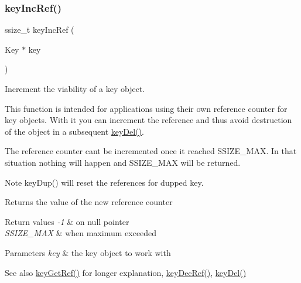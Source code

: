 \subsubsection{\texorpdfstring{key\+Inc\+Ref()}{keyIncRef()}}
{\footnotesize\ttfamily ssize\+\_\+t key\+Inc\+Ref (\begin{DoxyParamCaption}\item[{Key $\ast$}]{key }\end{DoxyParamCaption})}



Increment the viability of a key object. 

This function is intended for applications using their own reference counter for key objects. With it you can increment the reference and thus avoid destruction of the object in a subsequent \hyperlink{group__key_ga3df95bbc2494e3e6703ece5639be5bb1}{key\+Del()}.

The reference counter can\textquotesingle{}t be incremented once it reached S\+S\+I\+Z\+E\+\_\+\+M\+AX. In that situation nothing will happen and S\+S\+I\+Z\+E\+\_\+\+M\+AX will be returned.

\begin{DoxyNote}{Note}
key\+Dup() will reset the references for dupped key.
\end{DoxyNote}
\begin{DoxyReturn}{Returns}
the value of the new reference counter 
\end{DoxyReturn}

\begin{DoxyRetVals}{Return values}
{\em -\/1} & on null pointer \\
\hline
{\em S\+S\+I\+Z\+E\+\_\+\+M\+AX} & when maximum exceeded \\
\hline
\end{DoxyRetVals}

\begin{DoxyParams}{Parameters}
{\em key} & the key object to work with \\
\hline
\end{DoxyParams}
\begin{DoxySeeAlso}{See also}
\hyperlink{group__key_ga4aabc4272506dd63161db2bbb42de8ae}{key\+Get\+Ref()} for longer explanation, \hyperlink{group__key_ga2c6433ca22109e4e141946057eccb283}{key\+Dec\+Ref()}, \hyperlink{group__key_ga3df95bbc2494e3e6703ece5639be5bb1}{key\+Del()} 
\end{DoxySeeAlso}
\mbox{\label{group__key_ga769882e86e34a95cefcf8f260ef97e06}} 
